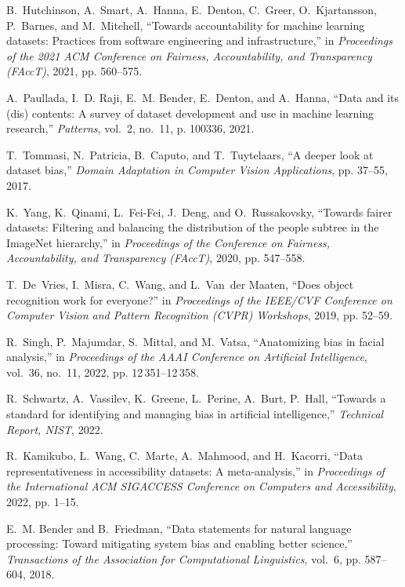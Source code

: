 \documentclass[journal]{IEEEtran}
\begin{document}
\begin{thebibliography}{100}
B.~Hutchinson, A.~Smart, A.~Hanna, E.~Denton, C.~Greer, O.~Kjartansson,
  P.~Barnes, and M.~Mitchell, ``Towards accountability for machine learning
  datasets: Practices from software engineering and infrastructure,'' in
  \emph{Proceedings of the 2021 ACM Conference on Fairness, Accountability, and
  Transparency (FAccT)}, 2021, pp. 560--575.

A.~Paullada, I.~D. Raji, E.~M. Bender, E.~Denton, and A.~Hanna, ``Data and its
  (dis) contents: A survey of dataset development and use in machine learning
  research,'' \emph{Patterns}, vol.~2, no.~11, p. 100336, 2021.

T.~Tommasi, N.~Patricia, B.~Caputo, and T.~Tuytelaars, ``A deeper look at
  dataset bias,'' \emph{Domain Adaptation in Computer Vision Applications}, pp.
  37--55, 2017.

K.~Yang, K.~Qinami, L.~Fei-Fei, J.~Deng, and O.~Russakovsky, ``Towards fairer
  datasets: Filtering and balancing the distribution of the people subtree in the ImageNet hierarchy,'' in \emph{Proceedings of the Conference on Fairness, Accountability, and Transparency (FAccT)}, 2020, pp. 547--558.

T.~De~Vries, I.~Misra, C.~Wang, and L.~Van~der Maaten, ``Does object
  recognition work for everyone?'' in \emph{Proceedings of the IEEE/CVF Conference on Computer Vision and Pattern Recognition (CVPR) Workshops}, 2019, pp. 52--59.

R.~Singh, P.~Majumdar, S.~Mittal, and M.~Vatsa, ``Anatomizing bias in facial
  analysis,'' in \emph{Proceedings of the AAAI Conference on Artificial Intelligence}, vol.~36, no.~11, 2022, pp. 12\,351--12\,358.

R.~Schwartz, A.~Vassilev, K.~Greene, L.~Perine, A.~Burt, P.~Hall,
  ``Towards a standard for identifying and managing bias in artificial intelligence,'' \emph{Technical Report, NIST}, 2022.

R.~Kamikubo, L.~Wang, C.~Marte, A.~Mahmood, and H.~Kacorri, ``Data representativeness in accessibility datasets: A meta-analysis,'' in
  \emph{Proceedings of the International ACM SIGACCESS Conference on Computers and Accessibility}, 2022, pp. 1--15.

E.~M. Bender and B.~Friedman, ``Data statements for natural language
  processing: Toward mitigating system bias and enabling better science,''
  \emph{Transactions of the Association for Computational Linguistics}, vol.~6,
  pp. 587--604, 2018.


\end{thebibliography}
\end{document}
